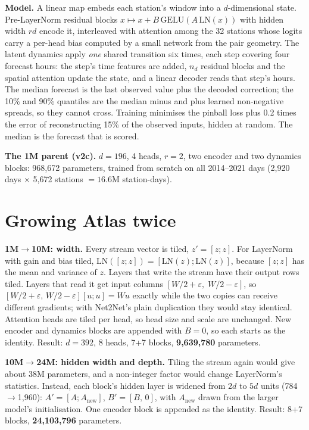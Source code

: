 \documentclass{article}
\begin{document}
\textbf{Model.} A linear map embeds each station's window into a $d$-dimensional state. Pre-LayerNorm residual blocks
$x\mapsto x+B\,\mathrm{GELU}(A\,\mathrm{LN}(x))$ with hidden width $rd$ encode it, interleaved with attention among the
32 stations whose logits carry a per-head bias computed by a small network from the pair geometry. The latent dynamics
apply \emph{one} shared transition six times, each step covering four forecast hours: the step's time features are
added, $n_d$ residual blocks and the spatial attention update the state, and a linear decoder reads that step's hours.
The median forecast is the last observed value plus the decoded correction; the 10\% and 90\% quantiles are the median
minus and plus learned non-negative spreads, so they cannot cross. Training minimises the pinball loss
\citep{koenker1978quantile} plus 0.2 times the error of reconstructing 15\% of the observed inputs, hidden at random.
The median is the forecast that is scored.

\textbf{The 1M parent (v2c).} $d=196$, 4 heads, $r=2$, two encoder and two dynamics blocks: 968,672 parameters,
trained from scratch on all 2014--2021 days (2,920 days $\times$ 5,672 stations $=16.6$M station-days).

\section{Growing Atlas twice}
\label{sec:grow}

\textbf{1M$\to$10M: width.} Every stream vector is tiled, $z'=[z;z]$. For LayerNorm \citep{ba2016layernorm} with gain
and bias tiled, $\mathrm{LN}([z;z])=[\mathrm{LN}(z);\mathrm{LN}(z)]$, because $[z;z]$ has the mean and variance of $z$.
Layers that write the stream have their output rows tiled. Layers that read it get input columns
$[W/2+\varepsilon,\;W/2-\varepsilon]$, so $[W/2+\varepsilon,\,W/2-\varepsilon][u;u]=Wu$ exactly while the two copies
can receive different gradients; with Net2Net's plain duplication they would stay identical. Attention heads are tiled
per head, so head size and scale are unchanged. New encoder and dynamics blocks are appended with $B=0$, so each starts
as the identity. Result: $d=392$, 8 heads, 7+7 blocks, \textbf{9,639,780} parameters.

\textbf{10M$\to$24M: hidden width and depth.} Tiling the stream again would give about 38M parameters, and a
non-integer factor would change LayerNorm's statistics. Instead, each block's hidden layer is widened from $2d$ to $5d$
units (784$\to$1,960): $A'=[A;A_{\text{new}}]$, $B'=[B,\,0]$, with $A_{\text{new}}$ drawn from the larger model's
initialisation. One encoder block is appended as the identity. Result: 8+7 blocks, \textbf{24,103,796} parameters.
\end{document}
